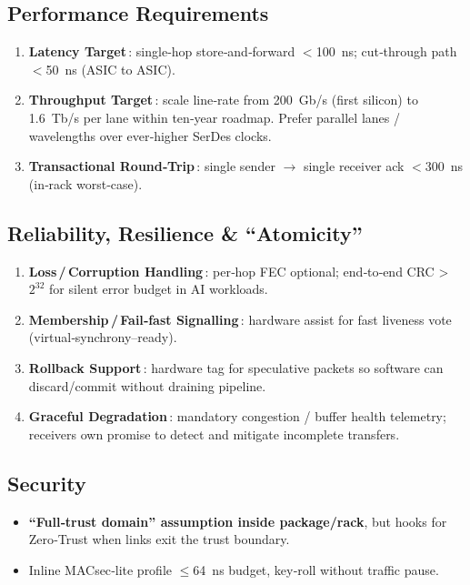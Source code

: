 \documentclass[../../../OAE-SPEC-MAIN.tex]{subfiles}
\begin{document}
\subsection{Performance Requirements}
\begin{enumerate}%
  \item \textbf{Latency Target}\,: single‑hop store‑and‑forward $<$100 ns; cut‑through path $<$50 ns (ASIC to ASIC).  
  \item \textbf{Throughput Target}\,: scale line‑rate from 200 Gb/s (first silicon) to 1.6 Tb/s per lane within ten‑year roadmap.  
        Prefer parallel lanes / wavelengths over ever‑higher SerDes clocks.  
  \item \textbf{Transactional Round‑Trip}\,: single sender $\rightarrow$ single receiver ack $<$300 ns (in‑rack worst‑case).
\end{enumerate}

\subsection{Reliability, Resilience \& “Atomicity”}
\begin{enumerate}%
  \item \textbf{Loss\,/\,Corruption Handling}\,: per‑hop FEC optional; end‑to‑end CRC \textgreater\,$2^{32}$ for silent error budget in AI workloads.  
  \item \textbf{Membership\,/\,Fail‑fast Signalling}\,: hardware assist for fast liveness vote (virtual‑synchrony–ready).  
  \item \textbf{Rollback Support}\,: hardware tag for speculative packets so software can discard/commit without draining pipeline.  
  \item \textbf{Graceful Degradation}\,: mandatory congestion / buffer health telemetry; receivers own promise to detect and mitigate incomplete transfers.
\end{enumerate}

\subsection{Security}
\begin{itemize}
  \item \textbf{“Full‑trust domain” assumption inside package/rack}, but hooks for Zero‑Trust when links exit the trust boundary.  
  \item Inline MACsec‑lite profile $\le$64 ns budget, key‑roll without traffic pause.
\end{itemize}
\end{document}
